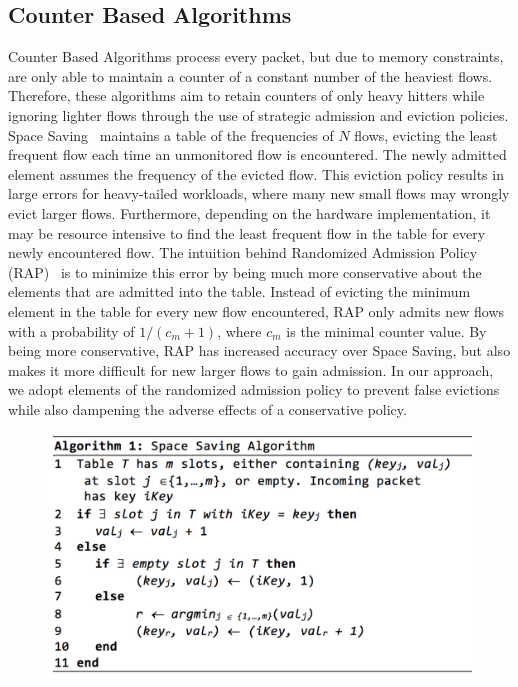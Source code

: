 \subsection{Counter Based Algorithms}
Counter Based Algorithms process every packet, but due to memory constraints, are only able to maintain a counter of a constant number of the heaviest flows. Therefore, these algorithms aim to retain counters of only heavy hitters while ignoring lighter flows through the use of strategic admission and eviction policies. Space Saving~\cite{spacesaving} maintains a table of the frequencies of $N$ flows, evicting the least frequent flow each time an unmonitored flow is encountered. The newly admitted element assumes the frequency of the evicted flow. This eviction policy results in large errors for heavy-tailed workloads, where many new small flows may wrongly evict larger flows. Furthermore, depending on the hardware implementation, it may be resource intensive to find the least frequent flow in the table for every newly encountered flow. 
The intuition behind Randomized Admission Policy (RAP)~\cite{rap} is to minimize this error by being much more conservative about the elements that are admitted into the table. Instead of evicting the minimum element in the table for every new flow encountered, RAP only admits new flows with a probability of $1/(c_m + 1)$, where $c_m$ is the minimal counter value. By being more conservative, RAP has increased accuracy over Space Saving, but also makes it more difficult for new larger flows to gain admission. In our approach, we adopt elements of the randomized admission policy to prevent false evictions while also dampening the adverse effects of a conservative policy. 
\begin{figure}[t]
  \centering
    \includegraphics[scale=0.42]{alg1}
     \label{fig:bp-image}
\end{figure}
